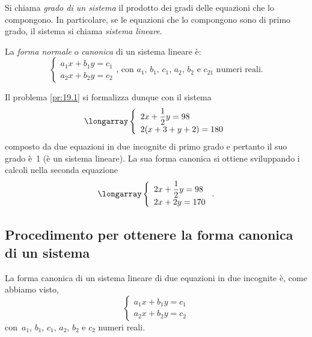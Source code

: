 \begin{definizione}
Si chiama \emph{grado di un sistema} il prodotto dei gradi delle
equazioni che lo compongono. In particolare, se le equazioni che lo
compongono sono di primo grado, il sistema si chiama \emph{sistema lineare}.

La \emph{forma normale} o \emph{canonica} di un sistema lineare è:
\[\left\{\begin{array}{l}a_{1}x+b_{1}y=c_{1}\\
a_{2}x+b_{2}y=c_{2} \end{array}\right.\text{, con }a_{1}\text{,~}b_{1}\text{,~}c_{1}\text{,~}a_{2}\text{,~}b_{2}\text{ e }c_{21}\text{ numeri reali.}\]
\end{definizione}

Il problema \ref{pr:19.1} si formalizza dunque con il sistema
\[\longarray\left\{\begin{array}{l}2x+\dfrac{1}{2}y=98
\\2(x+3+y+2)=180\end{array}\right.\]
composto da due equazioni in due incognite di primo grado e pertanto il suo grado
è~1 (è un sistema lineare). La sua forma canonica si ottiene
sviluppando i calcoli nella seconda equazione
\[\longarray\left\{\begin{array}{l}2x+\dfrac{1}{2}y=98\\
2x+2y=170 \end{array}\right..\]

\subsection{Procedimento per ottenere la forma canonica di un sistema}
La forma canonica di un sistema lineare di due equazioni in due
incognite è, come abbiamo visto,
\[\left\{\begin{array}{l}a_{1}x+b_{1}y=c_{1}
\\a_{2}x+b_{2}y=c_{2} \end{array}\right.\]
con~$a_{1}$, $b_{1}$, $c_{1}$, $a_{2}$, $b_{2}$ e $c_{2}$ numeri reali.


